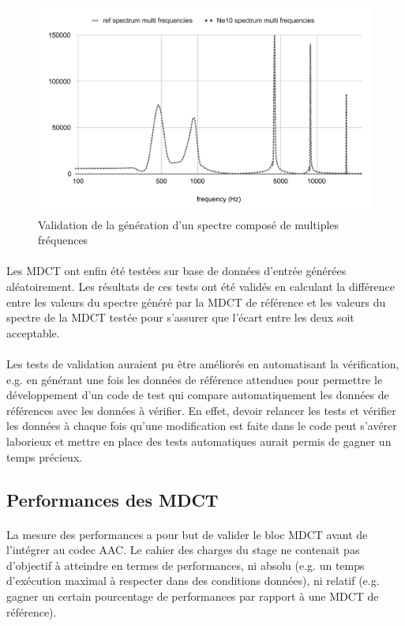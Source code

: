 \documentclass{article}
\begin{document}
    \begin{figure}[H]
        \centering
        \includegraphics[width=.8\linewidth]{./images/validation_multi_freq.pdf}
        \caption{Validation de la génération d'un spectre composé de multiples fréquences}
        \label{fig:validation_multi_freq}
    \end{figure}

    \paragraph{}
    Les MDCT ont enfin été testées sur base de données d'entrée générées aléatoirement. Les résultats de ces tests ont été validés en calculant la différence entre les valeurs du spectre généré par la MDCT de référence et les valeurs du spectre de la MDCT testée pour s'assurer que l'écart entre les deux soit acceptable.

    \paragraph{}
    Les tests de validation auraient pu être améliorés en automatisant la vérification, e.g. en générant une fois les données de référence attendues pour permettre le développement d'un code de test qui compare automatiquement les données de références avec les données à vérifier. En effet, devoir relancer les tests et vérifier les données à chaque fois qu'une modification est faite dans le code peut s'avérer laborieux et mettre en place des tests automatiques aurait permis de gagner un temps précieux.



    \subsection{Performances des MDCT}
    \label{sec:mdct_perfs}
    \paragraph{}
    La mesure des performances a pour but de valider le bloc MDCT avant de l'intégrer au codec AAC. Le cahier des charges du stage ne contenait pas d'objectif à atteindre en termes de performances, ni absolu (e.g. un temps d'exécution maximal à respecter dans des conditions données), ni relatif (e.g. gagner un certain pourcentage de performances par rapport à une MDCT de référence).
\end{document}
